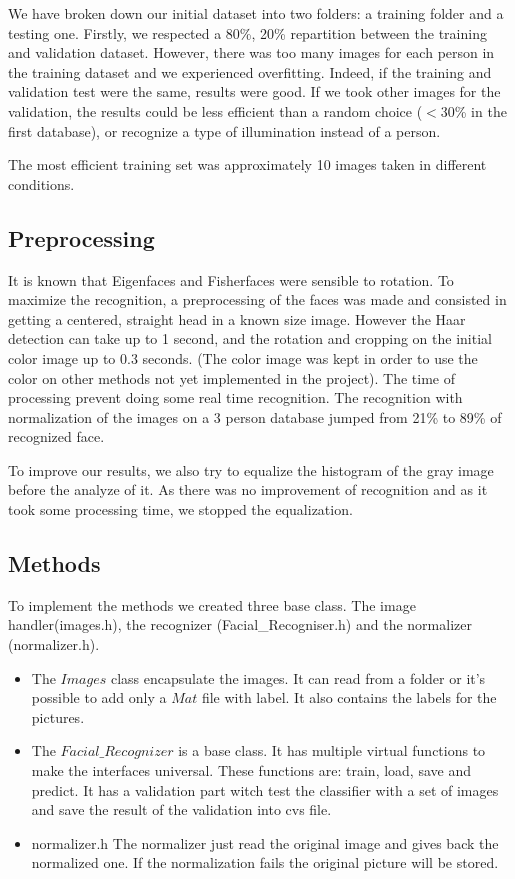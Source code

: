 We have broken down our initial dataset into two folders: a training folder and a testing one. Firstly, we respected a 80\%, 20\% repartition between the training and validation dataset. However, there was too many images for each person in the training dataset and we experienced overfitting. Indeed, if the training and validation test were the same, results were good. If we took other images for the validation, the results could be less efficient than a random choice ($<$30\% in the first database), or recognize a type of illumination instead of a person.

The most efficient training set was approximately 10 images taken in different conditions. 

\subsection{Preprocessing}
It is known that Eigenfaces and Fisherfaces were sensible to rotation. To maximize the recognition, a preprocessing of the faces was made and consisted in getting a centered, straight head in a known size image. However the Haar detection can take up to 1 second, and the rotation and cropping on the initial color image up to 0.3 seconds. (The color image was kept in order to use the color on other methods not yet implemented in the project). The time of processing prevent doing some real time recognition. The recognition with normalization of the images on a 3 person database jumped from 21\% to 89\% of recognized face.

To improve our results, we also try to equalize the histogram of the gray image before the analyze of it. As there was no improvement of recognition and as it took some processing time, we stopped the equalization.

\subsection{Methods}

To implement the methods we created three base class. The image handler(images.h), the recognizer (Facial\_Recogniser.h) and the normalizer (normalizer.h).
\begin{itemize}
	\item The $Images$ class encapsulate the images. It can read from a folder or it's possible to add only a $Mat$ file with label. It also contains the labels for the pictures.
	
	\item The $Facial\_Recognizer$ is a base class. It has multiple virtual functions to make the interfaces universal. These functions are: train, load, save and predict. It has a validation part witch test the classifier with a set of images and save the result of the validation into cvs file.
	
	\item normalizer.h
	The normalizer just read the original image and gives back the normalized one. If the normalization fails the original picture will be stored.
	
\end{itemize}


